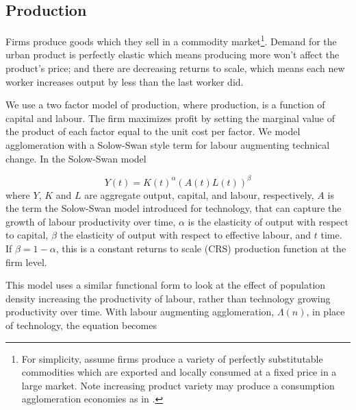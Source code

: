 \subsection{Production}

Firms produce goods which they sell in a commodity market\footnote{For simplicity, assume firms produce a variety of perfectly substitutable commodities which are exported and locally consumed at a fixed price in a large market. Note increasing product variety may produce a consumption agglomeration economies as in \cite{FujitaKrugmanVenables}.}. Demand for the urban product is perfectly elastic which means producing more won't affect the product's price; and there are decreasing returns to scale, which means each new worker increases output by less than the last worker did. 
  
We use a two factor model of production, where production, is a function of capital and labour. The firm maximizes profit by setting the marginal value of the product of each factor equal to the unit cost per factor. We model agglomeration with a Solow-Swan style term for labour augmenting technical change. In the Solow-Swan model 

 \begin{equation} 
Y(t)=K(t)^{\alpha }(A(t)L(t))^{\beta }
\label{Eqn:Solow-Swann}
 \end{equation}
where $Y$, $K$ and $L$ are aggregate output, capital, and labour, respectively,  $A$ is the term the Solow-Swan model introduced for technology, that can capture the growth of labour productivity over time, $\alpha$ is the elasticity of output with respect to capital, $\beta$ the elasticity of output with respect to effective labour, and $t$ time. If $\beta=1-\alpha$, this is a constant returns to scale (CRS) production function at the firm level.

 
This model uses a similar functional form to look at  the effect of population density increasing %
 the productivity of labour, rather than technology growing productivity over time. With labour augmenting agglomeration, $\Lambda(n)$, in place of technology, the equation becomes 

